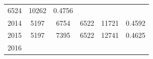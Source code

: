 \documentclass[10pt,]{article}
\begin{document}
\begin{longtable}[]{@{}cccccc@{}}
\begin{minipage}[t]{0.17\columnwidth}
6524\strut
\end{minipage} & \begin{minipage}[t]{0.14\columnwidth}\centering\strut
10262\strut
\end{minipage} & \begin{minipage}[t]{0.10\columnwidth}\centering\strut
0.4756\strut
\end{minipage}\tabularnewline
\begin{minipage}[t]{0.07\columnwidth}\centering\strut
2014\strut
\end{minipage} & \begin{minipage}[t]{0.19\columnwidth}\centering\strut
5197\strut
\end{minipage} & \begin{minipage}[t]{0.16\columnwidth}\centering\strut
6754\strut
\end{minipage} & \begin{minipage}[t]{0.17\columnwidth}\centering\strut
6522\strut
\end{minipage} & \begin{minipage}[t]{0.14\columnwidth}\centering\strut
11721\strut
\end{minipage} & \begin{minipage}[t]{0.10\columnwidth}\centering\strut
0.4592\strut
\end{minipage}\tabularnewline
\begin{minipage}[t]{0.07\columnwidth}\centering\strut
2015\strut
\end{minipage} & \begin{minipage}[t]{0.19\columnwidth}\centering\strut
5197\strut
\end{minipage} & \begin{minipage}[t]{0.16\columnwidth}\centering\strut
7395\strut
\end{minipage} & \begin{minipage}[t]{0.17\columnwidth}\centering\strut
6522\strut
\end{minipage} & \begin{minipage}[t]{0.14\columnwidth}\centering\strut
12741\strut
\end{minipage} & \begin{minipage}[t]{0.10\columnwidth}\centering\strut
0.4625\strut
\end{minipage}\tabularnewline
\begin{minipage}[t]{0.07\columnwidth}\centering\strut
2016\strut
\end{minipage} & \begin{minipage}[t]{0.19\columnwidth}\centering\strut

\end{minipage}
\end{longtable}
\end{document}

